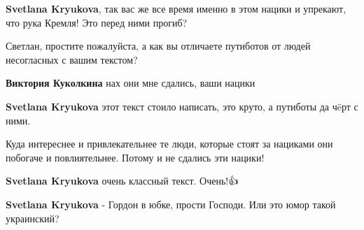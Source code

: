 \begin{itemize}
\begin{itemize}
\textbf{Svetlana Kryukova}, так вас же все время именно в этом нацики и упрекают, что рука Кремля! Это перед ними прогиб?

 
Светлан, простите пожалуйста, а как вы отличаете путиботов от людей несогласных с вашим текстом? \Smiley[1.0][yellow]


 
\textbf{Виктория Куколкина} нах они мне сдались, ваши нацики

 
\textbf{Svetlana Kryukova} этот текст стоило написать, это круто, а путиботы да чëрт с ними.

 

Куда интереснее и привлекательнее те люди, которые стоят за нациками они
побогаче и повлиятельнее. Потому и не сдались эти нацики! \Smiley[1.0][yellow]

 

\textbf{Svetlana Kryukova} очень классный текст. Очень!👍

 
\textbf{Svetlana Kryukova} - Гордон в юбке, прости Господи. Или это юмор такой украинский?


\end{itemize}
\end{itemize}
